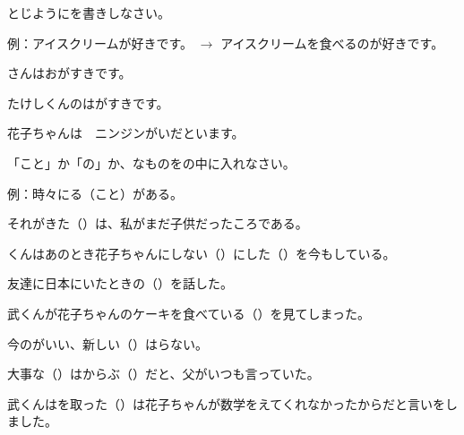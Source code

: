 
\author{Tomislav Mamić}

	
	\ten\begin{mondai}{とじようにを書きしなさい。}
		\itemsep0pt
		\item 例：アイスクリームが好きです。 $\rightarrow$ アイスクリームを食べるのが好きです。
		\item {}さんはおがすきです。
		\item たけしくんのは\hspace{10pt}がすきです。
		\item 花子ちゃんは　ニンジンがいだといます。
	\end{mondai}

	\vspace{20pt}
	\ten\begin{mondai}{「こと」か「の」か、なものをの中に入れなさい。}
		\itemsep0pt
		\item 例：時々にる（こと）がある。
		\item それがきた（\hspace{20pt}）は、私がまだ子供だったころである。
		\item{}くんはあのとき花子ちゃんにしない（\hspace{20pt}）にした（\hspace{20pt}）を今もしている。
		\item 友達に日本にいたときの（\hspace{20pt}）を話した。
		\item 武くんが花子ちゃんのケーキを食べている（\hspace{20pt}）を見てしまった。
		\item 今のがいい、新しい（\hspace{20pt}）はらない。
		\item 大事な（\hspace{20pt}）はからぶ（\hspace{20pt}）だと、父がいつも言っていた。
		\item 武くんはを取った（\hspace{20pt}）は花子ちゃんが数学をえてくれなかったからだと言いをしました。
	\end{mondai}
